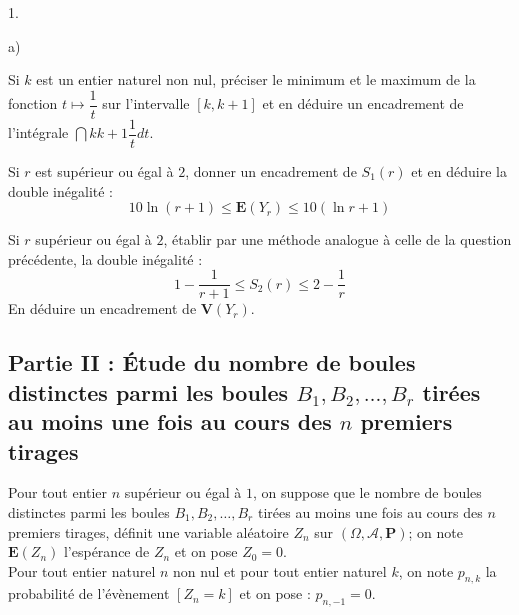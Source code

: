 \documentclass[11pt]{article}%
\begin{document}
\begin{noliste}{1.}
\item 

\begin{noliste}{a)}
 \setlength{\itemsep}{2mm}
\item Si $k$ est un entier naturel non nul, préciser le minimum et le
maximum de la fonction $t\mapsto \dfrac{1}{t}$ sur l'intervalle $[k,k +
1]$ et
en déduire un encadrement de l'intégrale $\dint{k}{k + 1}\dfrac{1}{t}dt
$.

\item Si $r$ est supérieur ou égal à $2$, donner un encadrement de
$S_{1}(r)$
et en déduire la double inégalité :
\[
10\ln (r + 1)\leq \mathbf{E}(Y_{r})\leq 10(\ln r + 1)
\]

\item Si $r$ supérieur ou égal à $2$, établir par une méthode analogue
à
celle de la question précédente, la double inégalité :
\[
1-\dfrac{1}{r + 1}\leq S_{2}(r)\leq 2-\dfrac{1}{r}
\]
En déduire un encadrement de $\mathbf{V}(Y_{r})$.
\end{noliste}
\end{noliste}

\subsection*{Partie II : Étude du nombre de boules distinctes parmi les
boules $B_{1},B_{2},\ldots,B_{r}$ tirées au moins une fois au cours des
$n$
premiers tirages}

Pour tout entier $n$ supérieur ou égal à $1$, on suppose que le nombre
de
boules distinctes parmi les boules $B_{1},B_{2},\ldots,B_{r}$ tirées au
moins une fois au cours des $n$ premiers tirages, définit une variable
aléatoire $Z_{n}$ sur $(\Omega,\mathcal{A},\mathbf{P})$; on note
$\mathbf{E}(Z_{n})$ l'espérance de $Z_{n}$ et on pose $Z_{0} = 0$.\\
Pour tout entier naturel $n$ non nul et pour tout entier naturel $k$,
on
note $p_{n,k}$ la probabilité de l'évènement $[Z_{n} = k]$ et on pose :
$p_{n,-1} = 0$.
\end{document}
